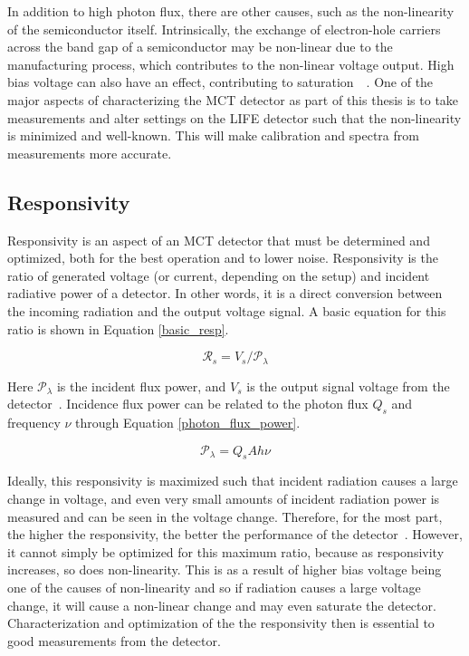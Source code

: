 In addition to high photon flux, there are other causes, such as the non-linearity of the semiconductor itself. Intrinsically, the exchange of electron-hole carriers across the band gap of a semiconductor may be non-linear due to the manufacturing process, which contributes to the non-linear voltage output. High bias voltage can also have an effect, contributing to saturation~\citep{current_measurement_MCTs}~\citep{MCT_linearity}. One of the major aspects of characterizing the MCT detector as part of this thesis is to take measurements and alter settings on the LIFE detector such that the non-linearity is minimized and well-known. This will make calibration and spectra from measurements more accurate.

\subsection {Responsivity}
Responsivity is an aspect of an MCT detector that must be determined and optimized, both for the best operation and to lower noise. Responsivity is the ratio of generated voltage (or current, depending on the setup) and incident radiative power of a detector. In other words, it is a direct conversion between the incoming radiation and the output voltage signal. A basic equation for this ratio is shown in Equation \ref{basic_resp}.

\begin{equation}\label{basic_resp}
    \mathcal{R}_s = V_s / \mathcal{P}_{\lambda}
\end{equation}

Here $\mathcal{P}_{\lambda}$ is the incident flux power, and $V_s$ is the output signal voltage from the detector~\citep{mct_detector_text_old}. Incidence flux power can be related to the photon flux $Q_s$ and frequency $\nu$ through Equation \ref{photon_flux_power}.

\begin{equation}\label{photon_flux_power}
    \mathcal{P}_\lambda = Q_s A h \nu
\end{equation}

Ideally, this responsivity is maximized such that incident radiation causes a large change in voltage, and even very small amounts of incident radiation power is measured and can be seen in the voltage change. Therefore, for the most part, the higher the responsivity, the better the performance of the detector~\citep{GLORIA_PhD}. However, it cannot simply be optimized for this maximum ratio, because as responsivity increases, so does non-linearity. This is as a result of higher bias voltage being one of the causes of non-linearity and so if radiation causes a large voltage change, it will cause a non-linear change and may even saturate the detector. Characterization and optimization of the the responsivity then is essential to good measurements from the detector.

